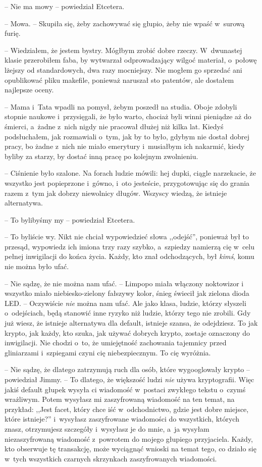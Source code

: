 \documentclass[oneside,polish,11pt,sfheadings]{mwbk}
\begin{document}
-- Nie ma mowy -- powiedział Etcetera.

-- Mowa. -- Skupiła się, żeby zachowywać się głupio, żeby nie wpaść w~surową furię.

-- Wiedziałem, że jestem bystry. Mógłbym zrobić dobre rzeczy. W~dwunastej
klasie przerobiłem faba, by wytwarzał odprowadzający wilgoć materiał, o~połowę lżejszy od standardowych, dwa razy mocniejszy. Nie mogłem go
sprzedać ani opublikować pliku makefile, ponieważ naruszał sto patentów,
ale dostałem najlepsze oceny.

-- Mama i~Tata wpadli na pomysł, żebym poszedł na studia. Oboje zdobyli
stopnie naukowe i~przysięgali, że było warto, chociaż byli winni
pieniądze aż do śmierci, a~żadne z~nich nigdy nie pracował dłużej niż
kilka lat. Kiedyś podsłuchałem, jak rozmawiali o~tym, jak by to było,
gdybym nie dostał dobrej pracy, bo żadne z~nich nie miało emerytury i~musiałbym ich nakarmić, kiedy byliby za starzy, by dostać inną pracę po
kolejnym zwolnieniu.

-- Ciśnienie było szalone. Na forach ludzie mówili: hej dupki, ciągle
narzekacie, że wszystko jest popieprzone i~gówno, i~oto jesteście,
przygotowując się do grania razem z~tym jak dobrzy niewolnicy długów.
Wszyscy wiedzą, że istnieje alternatywa.

-- To bylibyśmy my -- powiedział Etcetera.

-- To byliście wy. Nikt nie chciał wypowiedzieć słowa ,,odejść'',
ponieważ był to przesąd, wypowiedz ich imiona trzy razy szybko, a~szpiedzy namierzą cię w~celu pełnej inwigilacji do końca życia. Każdy, kto
znał odchodzących, był \textit{kimś}, komu nie można było ufać.

-- Nie sądzę, że nie można nam ufać. -- Limpopo miała włączony noktowizor
i wszystko miało niebiesko-zielony fałszywy kolor, śnieg świecił jak
zielona dioda LED. -- Oczywiście \textit{nie} można nam ufać. Ale jako
klasa, ludzie, którzy słyszeli o~odejściach, będą stanowić inne ryzyko
niż ludzie, którzy tego nie zrobili. Gdy już wiesz, że istnieje
alternatywa dla default, istnieje szansa, że odejdziesz. To jak krypto,
jak każdy, kto szuka, jak używać dobrych krypto, zostaje oznaczony do
inwigilacji. Nie chodzi o~to, że umiejętność zachowania tajemnicy przed
gliniarzami i~szpiegami czyni cię niebezpiecznym. To cię wyróżnia.

-- Nie sądzę, że dlatego zatrzymują ruch dla osób, które wygooglowały
krypto -- powiedział Jimmy. -- To dlatego, że większość ludzi \textit{nie}
używa kryptografii. Więc jakiś default głupek wysyła ci wiadomość w~postaci zwykłego tekstu o~czymś wrażliwym. Potem wysyłasz mi
zaszyfrowaną wiadomość na ten temat, na przykład: ,,Jest facet, który
chce iść w~odchodnictwo, gdzie jest dobre miejsce, które istnieje?'' i~wysyłasz zaszyfrowane wiadomości do wszystkich, których znasz,
otrzymujesz szczegóły i~wysyłasz je do mnie, a~ja wysyłam
niezaszyfrowaną wiadomość z~powrotem do mojego głupiego przyjaciela.
Każdy, kto obserwuje tę transakcję, może wyciągnąć wnioski na temat
tego, co działo się w~tych wszystkich czarnych skrzynkach zaszyfrowanych
wiadomości.
\end{document}
